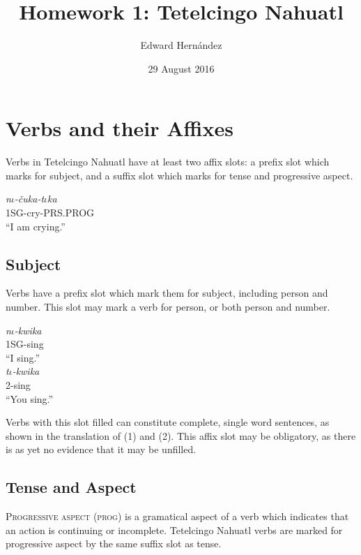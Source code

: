 \documentclass[doc,12pt]{apa6}
\begin{document}
\title{Homework 1: Tetelcingo Nahuatl}
\author{Edward Hern\'{a}ndez}
\date{29 August 2016}
\maketitle

\setcounter{secnumdepth}{3}

\section{Verbs and their Affixes}

Verbs in Tetelcingo Nahuatl have at least two affix slots: a prefix slot which
marks for subject, and a suffix slot which marks for tense and progressive
aspect.

\begin{exe}
	\ex \textit{n$\iota$-\v{c}uka-t$\iota$ka} \\
	1SG-cry-PRS.PROG \\
	``I am crying.''
\end{exe}

\subsection{Subject}

Verbs have a prefix slot which mark them for subject, including person and
number. This slot may mark a verb for person, or both person and
number.

\begin{exe}
	\ex \textit{n$\iota$-kwika} \\
		1SG-sing \\
		``I sing.'' \\
	\ex \textit{t$\iota$-kwika} \\
		2-sing \\
		``You sing.''
\end{exe}

Verbs with this slot filled can constitute complete, single word sentences, as
shown in the translation of (1) and (2). This affix slot may be obligatory, as
there is as yet no evidence that it may be unfilled.

\subsection{Tense and Aspect}

\textsc{Progressive aspect} (\textsc{prog}) is a gramatical aspect of a verb which
indicates that an action is continuing or incomplete. Tetelcingo Nahuatl verbs
are marked for progressive aspect by the same suffix slot as tense.
\end{document}
